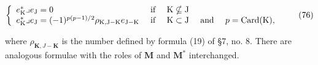 \[
\left\{ \begin{array}{l l} e _ {\mathrm{K}} ^ {*} \lrcorner e _ {\mathrm{J}} = 0 & \text { if } \quad \mathrm{K} \nsubseteq \mathrm{J} \\ e _ {\mathrm{K}} ^ {*} \lrcorner e _ {\mathrm{J}} = (- 1) ^ {p (p - 1) / 2} \rho_ {\mathrm{K}, \mathrm{J} - \mathrm{K}} e _ {\mathrm{J} - \mathrm{K}} & \text { if } \quad \mathrm{K} \subset \mathrm{J} \quad \text { and } \quad p = \operatorname{Card} (\mathrm{K}), \end{array} \right.\tag{76}
\]

where \(\rho_{\mathbf{K},J - \mathbf{K}}\) is the number defined by formula (19) of §7, no. 8. There are analogous formulae with the roles of \(\mathbf{M}\) and \(\mathbf{M}^*\) interchanged.

